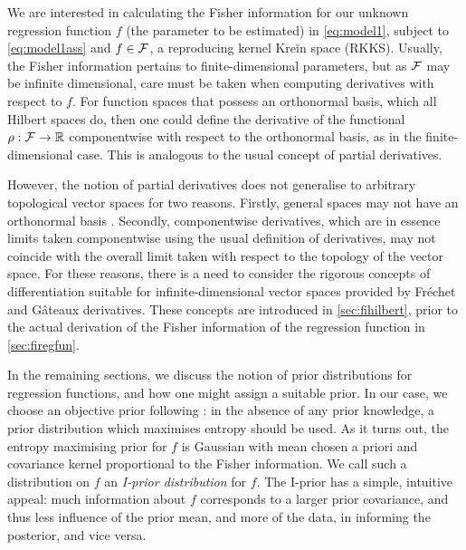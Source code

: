 \documentclass[showframe,11pt,twoside,openright]{report}
\begin{document}
\label{chapter3}
\thispagestyle{chapterthree}

\newcommand{\funder}{\rho}  %

We are interested in calculating the Fisher information for our unknown regression function $f$ (the parameter to be estimated) in \cref{eq:model1}, subject to \cref{eq:model1ass} and $f\in{\mathcal F}$, a reproducing kernel Kreĭn space (RKKS).
Usually, the Fisher information pertains to finite-dimensional parameters, but as ${\mathcal F}$ may be infinite dimensional, care must be taken when computing derivatives with respect to $f$.
For function spaces that possess an orthonormal basis, which all Hilbert spaces do, then one could define the derivative of the functional $\funder:\cF\to\bbR$ componentwise with respect to the orthonormal basis, as in the finite-dimensional case.
This is analogous to the usual concept of partial derivatives.

However, the notion of partial derivatives does not generalise to arbitrary topological vector spaces for two reasons.
Firstly, general spaces may not have an orthonormal basis \citep[Sec. 5, p. 76]{tapia1971diff}.
Secondly, componentwise derivatives, which are in essence limits taken componentwise using the usual definition of derivatives, may not coincide with the overall limit taken with respect to the topology of the vector space.
For these reasons, there is a need to consider the rigorous concepts of differentiation suitable for infinite-dimensional vector spaces provided by Fréchet and Gâteaux derivatives.
These concepts are introduced in \cref{sec:fihilbert}, prior to the actual derivation of the Fisher information of the regression function in \cref{sec:firegfun}.

In the remaining sections, we discuss the notion of prior distributions for regression functions, and how one might assign a suitable prior.
In our case, we choose an objective prior following \citep{jaynes1957a,jaynes1957b,jaynes2003probability}: in the absence of any prior knowledge, a prior distribution which maximises entropy should be used.
As it turns out, the entropy maximising prior for $f$ is Gaussian with mean chosen a priori and covariance kernel proportional to the Fisher information.
We call such a distribution on $f$ an \emph{I-prior distribution} for $f$.
The I-prior has a simple, intuitive appeal: much information about $f$ corresponds to a larger prior covariance, and thus less influence of the prior mean, and more of the data, in informing the posterior, and vice versa.
\end{document}
